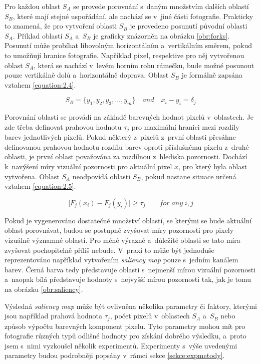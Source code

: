 Pro každou oblast $S_A$ se provede porovnání s~daným množstvím dalších oblastí $S_B$, které mají stejné uspořádání, ale nachází se v~jiné části fotografie. Prakticky to znamená, že pro vytvoření oblasti $S_B$ je provedeno posunutí původní oblasti $S_A$. Příklad oblastí $S_A$ a~$S_B$ je graficky znázorněn na obrázku \ref{obr:forks}. Posunutí může probíhat libovolným horizontálním a~vertikálním směrem, pokud to umožňují hranice fotografie. Například pixel, respektive pro něj vytvořenou oblast $S_A$, která se nachází v~levém horním rohu rámečku, bude možné posunout pouze vertikálně dolů a~horizontálně doprava. Oblast $S_B$ je formálně zapsána vztahem \ref{equation:2.4}.

\begin{equation} \label{equation:2.4}
S_B = \{ y_1, y_2, y_3, \dots, y_m \}
\quad and \quad x_i - y_i = \delta_j
\end{equation}

Porovnání oblastí se provádí na základě barevných hodnot pixelů v~oblastech. Je zde třeba definovat prahovou hodnotu $\tau_j$ pro maximální hranici mezi rozdíly barev jednotlivých pixelů. Pokud některý z~pixelů z~první oblasti přesáhne definovanou prahovou hodnotu rozdílu barev oproti příslušnému pixelu z~druhé oblasti, je první oblast považována za rozdílnou z~hlediska pozornosti. Dochází k~navýšení míry vizuální pozornosti pro aktuální pixel $x$, pro který byla oblast vytvořena. Oblast $S_A$ neodpovídá oblasti $S_B$, pokud nastane situace určená vztahem \ref{equation:2.5}.

\begin{equation} \label{equation:2.5}
\lvert F_j(x_i) - F_j(y_i) \rvert \geq \tau_j \qquad for\; any\; i,j
\end{equation}

Pokud je vygenerováno dostatečné množství oblastí, se kterými se bude aktuální oblast porovnávat, budou se postupně zvyšovat míry pozornosti pro pixely vizuálně významné oblasti. Pro méně výrazné a~důležité oblasti se tato míra zvyšovat pochopitelně příliš nebude. V~praxi to může být jednoduše reprezentováno například vytvořením \emph{saliency map} pouze s~jedním kanálem barev. Černá barva tedy představuje oblasti s~nejmenší mírou vizuální pozornosti a~naopak bílá představuje hodnoty s~nejvyšší mírou pozornosti tak, jak je tomu na obrázku \ref{obr:saliency}.

Výsledná \emph{saliency map} může být ovlivněna několika parametry či faktory, kterými jsou například prahová hodnota $\tau_j$, počet pixelů v~oblastech $S_A$ a~$S_B$ nebo způsob výpočtu barevných komponent pixelu. Tyto parametry mohou mít pro fotografie různých typů odlišné hodnoty pro získání dobrého výsledku, a~proto jsem s~nimi vyzkoušel několik experimentů. Experimenty s~výše uvedenými parametry budou podrobněji popsány v~rámci sekce \ref{sekce:expmetody}.

